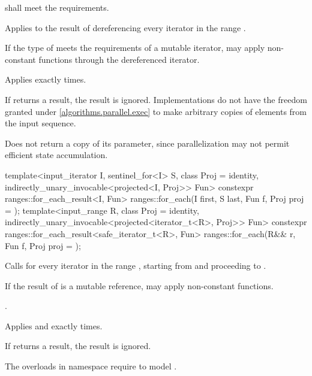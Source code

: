 \begin{itemdescr}
\pnum
\requires
{} shall meet the  requirements.

\pnum
\effects
Applies  to the result of dereferencing
every iterator in the range .
\begin{note}
If the type of  meets the requirements of a mutable iterator,
 may apply non-constant functions through the dereferenced iterator.
\end{note}

\pnum
\complexity
Applies  exactly  times.

\pnum
\remarks
If  returns a result, the result is ignored.
Implementations do not have
the freedom granted under \ref{algorithms.parallel.exec}
to make arbitrary copies of elements from the input sequence.

\pnum
\begin{note}
Does not return a copy of its  parameter,
since parallelization may not permit efficient state accumulation.
\end{note}
\end{itemdescr}

%
\begin{itemdecl}
template<input_iterator I, sentinel_for<I> S, class Proj = identity,
         indirectly_unary_invocable<projected<I, Proj>> Fun>
  constexpr ranges::for_each_result<I, Fun>
    ranges::for_each(I first, S last, Fun f, Proj proj = {});
template<input_range R, class Proj = identity,
         indirectly_unary_invocable<projected<iterator_t<R>, Proj>> Fun>
  constexpr ranges::for_each_result<safe_iterator_t<R>, Fun>
    ranges::for_each(R&& r, Fun f, Proj proj = {});
\end{itemdecl}

\begin{itemdescr}
\pnum
\effects
Calls 
for every iterator  in the range ,
starting from  and proceeding to .
\begin{note}
If the result of  is a mutable reference,
 may apply non-constant functions.
\end{note}

\pnum
\returns
{}.

\pnum
\complexity
Applies  and  exactly  times.

\pnum
\remarks
If  returns a result, the result is ignored.

\pnum
\begin{note}
The overloads in namespace  require
 to model .
\end{note}
\end{itemdescr}


